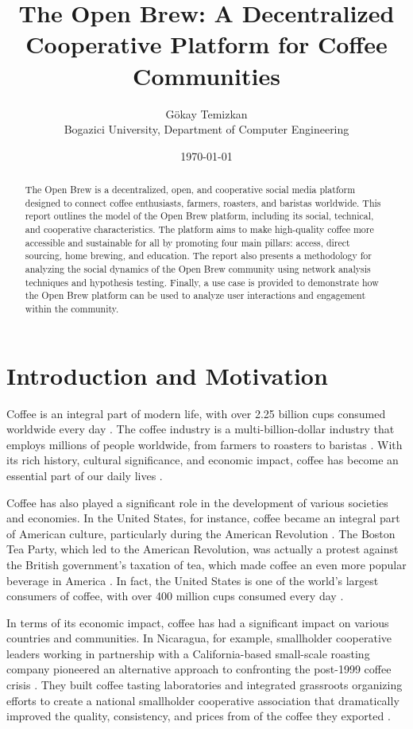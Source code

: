 \documentclass[12pt]{article}
\title{The Open Brew: A Decentralized Cooperative Platform for Coffee Communities}
\author{Gökay Temizkan\\
Bogazici University, Department of Computer Engineering\\}
\date{\today}
\begin{document}
\maketitle

\begin{abstract}
The Open Brew is a decentralized, open, and cooperative social media platform designed to connect coffee enthusiasts, farmers, roasters, and baristas worldwide. This report outlines the model of the Open Brew platform, including its social, technical, and cooperative characteristics. The platform aims to make high-quality coffee more accessible and sustainable for all by promoting four main pillars: access, direct sourcing, home brewing, and education. The report also presents a methodology for analyzing the social dynamics of the Open Brew community using network analysis techniques and hypothesis testing. Finally, a use case is provided to demonstrate how the Open Brew platform can be used to analyze user interactions and engagement within the community.
\end{abstract}

\section{Introduction and Motivation}
\label{section:introduction_and_motivation}
Coffee is an integral part of modern life, with over 2.25 billion cups consumed worldwide every day \cite{Paterek2024CoffeeLI}. The coffee industry is a multi-billion-dollar industry that employs millions of people worldwide, from farmers to roasters to baristas \cite{Paterek2024CoffeeLI}. With its rich history, cultural significance, and economic impact, coffee has become an essential part of our daily lives \cite{Paterek2024CoffeeLI}.

Coffee has also played a significant role in the development of various societies and economies. In the United States, for instance, coffee became an integral part of American culture, particularly during the American Revolution \cite{Paterek2024CoffeeLI}. The Boston Tea Party, which led to the American Revolution, was actually a protest against the British government's taxation of tea, which made coffee an even more popular beverage in America \cite{Paterek2024CoffeeLI}. In fact, the United States is one of the world's largest consumers of coffee, with over 400 million cups consumed every day \cite{Paterek2024CoffeeLI}.

In terms of its economic impact, coffee has had a significant impact on various countries and communities. In Nicaragua, for example, smallholder cooperative leaders working in partnership with a California-based small-scale roasting company pioneered an alternative approach to confronting the post-1999 coffee crisis \cite{Bacon2013QualityRS}. They built coffee tasting laboratories and integrated grassroots organizing efforts to create a national smallholder cooperative association that dramatically improved the quality, consistency, and prices from of the coffee they exported \cite{Bacon2013QualityRS}.
\end{document}
